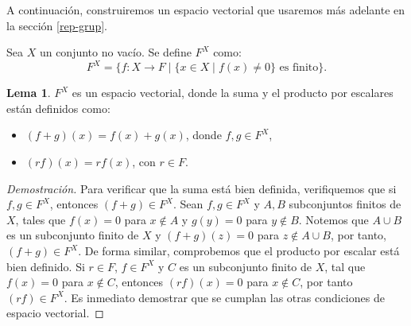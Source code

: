 \documentclass[12pt]{book}
\theoremstyle{definition}
\newtheorem{lemma}[theorem]{Lema}
\newcounter{in}
\newcounter{ini}
\begin{document}
A continuación, construiremos un espacio vectorial 
que usaremos más adelante en la sección \ref{rep-grup}.

Sea $X$ un conjunto no vacío. Se define $F^{X}$ como:
\begin{equation*}
  F^{X}=\{f:X\rightarrow F\mid \{x\in X\mid f(x)\neq 0\} \mbox{ es finito}\}.
\end{equation*}

\begin{lemma}
  \label{FX}
  $F^{X}$ es un espacio vectorial, donde la suma y el producto por
  escalares están definidos como:
  \begin{itemize}
  \item $(f+g)(x)=f(x)+g(x)$, donde $f,g\in F^{X}$,
  \item $(rf)(x)=rf(x)$, con $r\in F$.
  \end{itemize}
\end{lemma}

\begin{proof}[Demostración]
  Para verificar que la suma está bien definida, verifiquemos que si
  $f,g\in F^{X}$, entonces $(f+g) \in F^{X}$. Sean $f,g\in F^{X}$ y $A,B$
  subconjuntos finitos de $X$, tales que $f(x)=0$ para $x\not\in A$ y
  $g(y)=0$ para $y\not\in B$. Notemos que $A\cup B$ es un
  subconjunto finito de $X$ y $(f+g)(z)=0$ para $z\not\in A\cup
  B$, por tanto, $(f+g) \in F^{X}$. De forma similar, comprobemos que el
  producto por escalar está bien definido. Si $r\in F$, $f\in F^{X}$ y
  $C$ es un subconjunto finito de $X$, tal que $f(x)=0$ para $x\not\in
  C$, entonces $(rf)(x)=0$ para $x\not\in C$, por tanto~$(rf)\in
  F^{X}$. Es inmediato demostrar que se cumplan las otras condiciones de
  espacio vectorial.
\end{proof}
\end{document}
